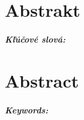 \documentclass[12pt, twoside, openany]{book}
\begin{document}
\vfill\eject


\newpage
\thispagestyle{empty}
\chapter*{Abstrakt}\label{chap:abstract_sk}


\paragraph*{Kľúčové slová:}


\newpage
\thispagestyle{empty}
\chapter*{Abstract}\label{chap:abstract_en}


\paragraph*{Keywords:}




\newpage
\tableofcontents



\newpage
\listoffigures
\listoftables


\mainmatter





\backmatter

\nocite{*}

%

\end{document}
